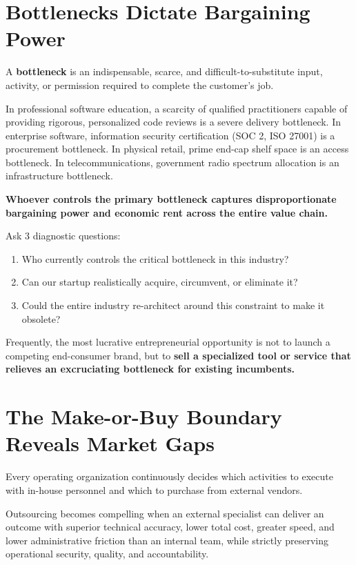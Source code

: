 \section{Bottlenecks Dictate Bargaining Power}

A \textbf{bottleneck} is an indispensable, scarce, and difficult-to-substitute input, activity, or permission required to complete the customer's job.

In professional software education, a scarcity of qualified practitioners capable of providing rigorous, personalized code reviews is a severe delivery bottleneck. In enterprise software, information security certification (SOC 2, ISO 27001) is a procurement bottleneck. In physical retail, prime end-cap shelf space is an access bottleneck. In telecommunications, government radio spectrum allocation is an infrastructure bottleneck.

\textbf{Whoever controls the primary bottleneck captures disproportionate bargaining power and economic rent across the entire value chain.}

Ask 3 diagnostic questions:
\begin{enumerate}[leftmargin=12pt,itemsep=1pt,topsep=1pt,parsep=0pt]
  \item Who currently controls the critical bottleneck in this industry?
  \item Can our startup realistically acquire, circumvent, or eliminate it?
  \item Could the entire industry re-architect around this constraint to make it obsolete?
\end{enumerate}

Frequently, the most lucrative entrepreneurial opportunity is not to launch a competing end-consumer brand, but to \textbf{sell a specialized tool or service that relieves an excruciating bottleneck for existing incumbents.}

\section{The Make-or-Buy Boundary Reveals Market Gaps}

Every operating organization continuously decides which activities to execute with in-house personnel and which to purchase from external vendors.

Outsourcing becomes compelling when an external specialist can deliver an outcome with superior technical accuracy, lower total cost, greater speed, and lower administrative friction than an internal team, while strictly preserving operational security, quality, and accountability.


